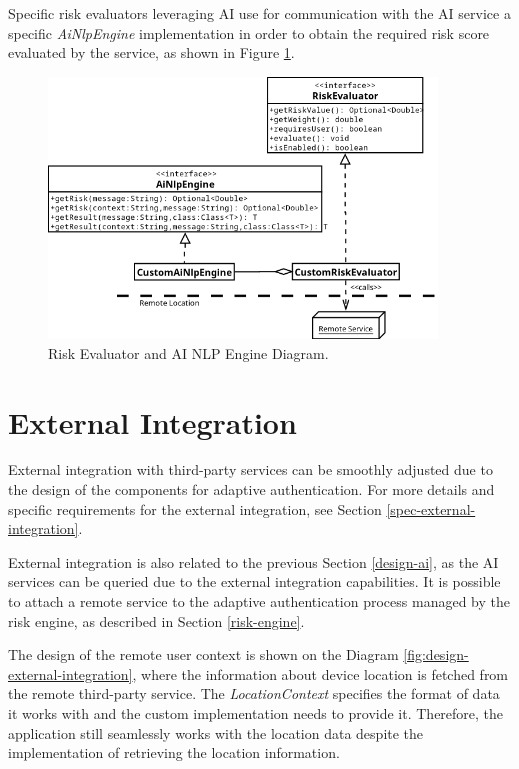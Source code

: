 Specific risk evaluators leveraging AI use for communication with the AI service a specific \textit{AiNlpEngine} implementation in order to obtain the required risk score evaluated by the service, as shown in Figure \ref{fig:ai-engine-remote-diagram}. 

\begin{figure}[htbp]
  \centering
  \includegraphics[width=0.92\textwidth]{img/sections/5-design/ai-engine-remote.png}
  \caption{Risk Evaluator and AI NLP Engine Diagram.}
  \label{fig:ai-engine-remote-diagram}
\end{figure}

\newpage

\section{External Integration} \label{design-external-integration}
External integration with third-party services can be smoothly adjusted due to the design of the components for adaptive authentication.
For more details and specific requirements for the external integration, see Section \ref{spec-external-integration}.

External integration is also related to the previous Section \ref{design-ai}, as the AI services can be queried due to the external integration capabilities.
It is possible to attach a remote service to the adaptive authentication process managed by the risk engine, as described in Section \ref{risk-engine}.

The design of the remote user context is shown on the Diagram \ref{fig:design-external-integration}, where the information about device location is fetched from the remote third-party service. 
The \textit{LocationContext} specifies the format of data it works with and the custom implementation needs to provide it.
Therefore, the application still seamlessly works with the location data despite the implementation of retrieving the location information.

